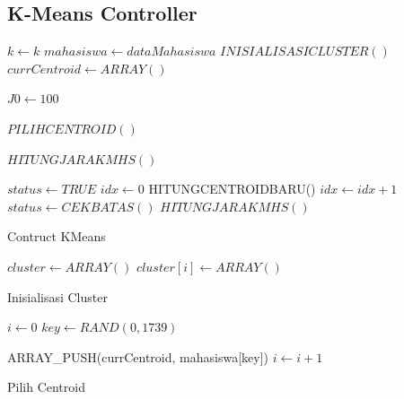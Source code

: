 \subsection{K-Means Controller}
\label{subsec:kmeans}

\begin{algorithm}[H]
  \begin{algorithmic}[1]
        \State $k \gets k$
        \State $mahasiswa \gets dataMahasiswa$
        \State $INISIALISASICLUSTER()$
        \State $currCentroid \gets ARRAY()$ 
        
        \State $J0 \gets 100$ 
        
        \State $PILIHCENTROID()$
        
        \State $HITUNGJARAKMHS()$
        
        \State $status \gets TRUE$
        \State $ idx \gets 0$
            \State HITUNGCENTROIDBARU()
            \State $idx \gets idx + 1$
            \State $status \gets CEKBATAS()$
            \State $HITUNGJARAKMHS()$
        \EndWhile
    \EndProcedure
  \end{algorithmic} 
  \caption{Contruct KMeans}
  \label{alg:Contruct kmeans}
\end{algorithm}

\begin{algorithm}[H]
  \begin{algorithmic}[1]
        \State $cluster \gets ARRAY()$
            \State $cluster[i] \gets ARRAY()$
        \EndFor
    \EndProcedure
  \end{algorithmic} 
  \caption{Inisialisasi Cluster}
  \label{alg:inisialisasi cluster}
\end{algorithm}

\begin{algorithm}[H]
  \begin{algorithmic}[1]
        \State $i \gets 0$
            \State $key \gets RAND(0,1739)$ 
            
                    \State ARRAY\_PUSH(currCentroid, mahasiswa[key])
                    \State $i \gets i+1$
                \EndIf
            \EndIf
        \EndWhile
    \EndProcedure
  \end{algorithmic} 
  \caption{Pilih Centroid}
  \label{alg:pilih centroid}
\end{algorithm}


